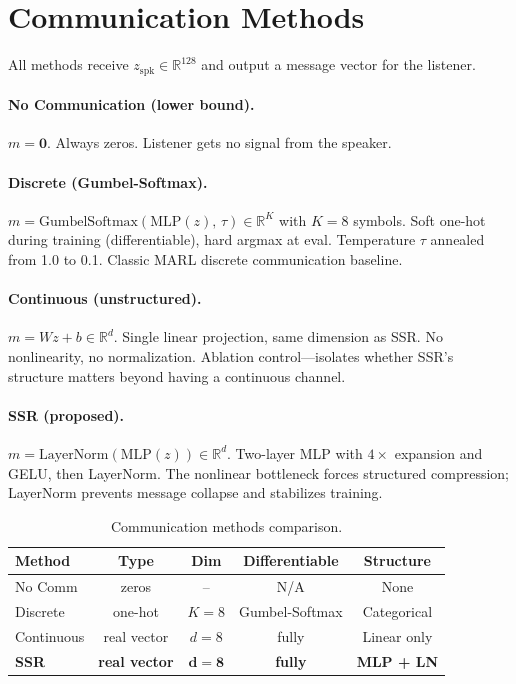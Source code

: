 \documentclass[11pt,a4paper]{article}
\begin{document}
\section{Communication Methods}

All methods receive $z_{\mathrm{spk}} \in \mathbb{R}^{128}$ and output a message vector for the listener.

\paragraph{No Communication (lower bound).}
$m = \mathbf{0}$. Always zeros. Listener gets no signal from the speaker.

\paragraph{Discrete (Gumbel-Softmax).}
$m = \mathrm{GumbelSoftmax}(\mathrm{MLP}(z),\, \tau) \in \mathbb{R}^K$ with $K{=}8$ symbols. Soft one-hot during training (differentiable), hard argmax at eval. Temperature $\tau$ annealed from 1.0 to 0.1. Classic MARL discrete communication baseline.

\paragraph{Continuous (unstructured).}
$m = Wz + b \in \mathbb{R}^d$. Single linear projection, same dimension as SSR. No nonlinearity, no normalization. Ablation control---isolates whether SSR's structure matters beyond having a continuous channel.

\paragraph{SSR (proposed).}
$m = \mathrm{LayerNorm}(\mathrm{MLP}(z)) \in \mathbb{R}^d$. Two-layer MLP with $4{\times}$ expansion and GELU, then LayerNorm. The nonlinear bottleneck forces structured compression; LayerNorm prevents message collapse and stabilizes training.

\begin{table}[h]
\centering
\caption{Communication methods comparison.}
\vspace{0.3em}
\begin{tabular}{@{}lcccc@{}}
\toprule
\textbf{Method} & \textbf{Type} & \textbf{Dim} & \textbf{Differentiable} & \textbf{Structure} \\
\midrule
No Comm     & zeros       & --      & N/A            & None \\
Discrete    & one-hot     & $K{=}8$ & Gumbel-Softmax & Categorical \\
Continuous  & real vector & $d{=}8$ & fully          & Linear only \\
\textbf{SSR} & \textbf{real vector} & $\boldsymbol{d{=}8}$ & \textbf{fully} & \textbf{MLP + LN} \\
\bottomrule
\end{tabular}
\end{table}
\end{document}
